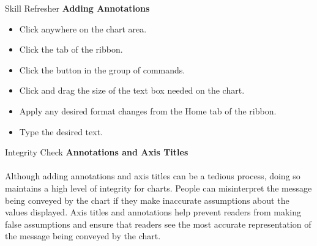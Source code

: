 \begin{center}
	\begin{sklbox}{Skill Refresher}
		\textbf{Adding Annotations}
		\\
		\begin{itemize}
			\setlength{\itemsep}{0pt}
			\setlength{\parskip}{0pt}
			\setlength{\parsep}{0pt}
			
			\item Click anywhere on the chart area.
			\item Click the  tab of the ribbon.
			\item Click the  button in the  group of commands.
			\item Click and drag the size of the text box needed on the chart.
			\item Apply any desired format changes from the Home tab of the ribbon.
			\item Type the desired text.
			
		\end{itemize}
	\end{sklbox}
\end{center}

\begin{center}
	\begin{infobox}{Integrity Check}
		\textbf{Annotations and Axis Titles}
		\\
		\\
		Although adding annotations and axis titles can be a tedious process, doing so maintains a high level of integrity for charts. People can misinterpret the message being conveyed by the chart if they make inaccurate assumptions about the values displayed. Axis titles and annotations help prevent readers from making false assumptions and ensure that readers see the most accurate representation of the message being conveyed by the chart.		
	\end{infobox}
\end{center}

